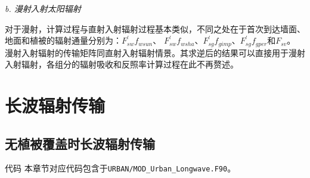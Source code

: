 \textit{b. 漫射入射太阳辐射}

对于漫射，计算过程与直射入射辐射过程基本类似，不同之处在于首次到达墙面、地面和植被的辐射通量分别为：$F_{sw}^\prime f_{wsun}$、
$F_{sw}^\prime f_{wsha}$、$F_{sg}^\prime f_{gimp}$、$F_{sg}^\prime f_{gper}$和$F_{sv}$。
漫射入射辐射的传输矩阵同直射入射辐射情景。其求逆后的结果可以直接用于漫射入射辐射，各组分的辐射吸收和反照率计算过程在此不再赘述。 

\section{长波辐射传输}
\subsection{无植被覆盖时长波辐射传输}
\begin{mymdframed}{代码}
本章节对应代码包含于\texttt{URBAN/MOD\_Urban\_Longwave.F90}。
\end{mymdframed}

